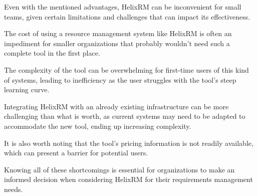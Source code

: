 Even with the mentioned advantages, HelixRM can be inconvenient for small teams, given certain
limitations and challenges that can impact its effectiveness.

The cost of using a resource management system like HelixRM
is often an impediment for smaller organizations that probably wouldn't need
such a complete tool in the first place\cite{lydia_y__chen_2019}.

The complexity of the tool can be overwhelming for first-time users of this kind of systems,
leading to inefficiency as the user struggles with the tool's steep learning curve\cite{the_submission_infrastructure}.

Integrating HelixRM with an already existing infrastructure can be more challenging
than what is worth, as current systems may need to be adapted to accommodate the new tool,
ending up increasing complexity\cite{christian_glaschke__2015}.

It is also worth noting that the tool's pricing information is not readily available,
which can present a barrier for potential users\footnotemark[2].

Knowing all of these shortcomings is essential for organizations to make an informed decision
when considering HelixRM for their requirements management needs.
